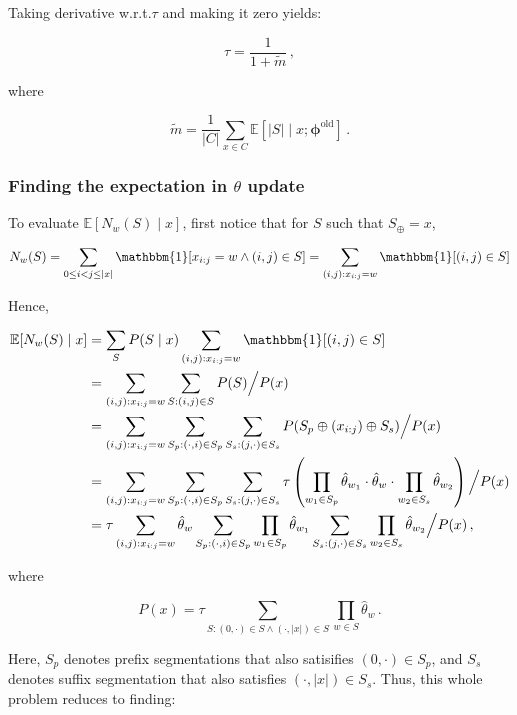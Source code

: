 \documentclass{article}
\begin{document}
\noindent
Taking derivative w.r.t.\@ $\tau$ and making it zero yields:

\[
    \tau = \frac{1}{1 + \tilde{m}}\,,
\]

\noindent
where

\[
    \tilde{m} = \frac{1}{|C|} \sum_{x \in C} \mathbb{E}[|S| \mid x; \boldsymbol\phi^\mathrm{old}]\,.
\]

\subsubsection{Finding the expectation in \texorpdfstring{$\theta$}{theta} update}
To evaluate $\mathbb{E}[N_w(S) \mid x]$, first notice that for $S$ such that $S_\oplus = x$,

\[
    N_w(S)
    = \sum_{0 \le i < j \le |x|} \mathbbm{1}[x_{i:j} = w \land (i,j) \in S]
    = \sum_{(i,j): x_{i:j} = w} \mathbbm{1}[(i,j) \in S]
\]

\noindent
Hence,

\[
    \begin{aligned}
        \mathbb{E}[N_w(S) \mid x]
        &= \sum_S P(S \mid x) \sum_{(i,j): x_{i:j} = w} \mathbbm{1}[(i,j) \in S]\\
        &= \sum_{(i,j): x_{i:j} = w} \sum_{S: (i,j) \in S} P(S) \Big/ P(x)\\
        &= \sum_{(i,j): x_{i:j} = w} \sum_{S_p: (\cdot, i) \in S_p} \sum_{S_s: (j, \cdot) \in S_s} P(S_p \oplus (x_{i:j}) \oplus S_s) \Big/ P(x)\\
        &= \sum_{(i,j): x_{i:j} = w} \sum_{S_p: (\cdot, i) \in S_p} \sum_{S_s: (j, \cdot) \in S_s} \tau \left(\prod_{w_1 \in S_p} \hat{\theta}_{w_1} \cdot \hat{\theta}_w \cdot \prod_{w_2 \in S_s} \hat{\theta}_{w_2}\right) \Big/ P(x)\\
        &= \tau \sum_{(i,j): x_{i:j} = w} \hat{\theta}_w \sum_{S_p: (\cdot, i) \in S_p} \prod_{w_1 \in S_p} \hat{\theta}_{w_1} \sum_{S_s: (j, \cdot) \in S_s} \prod_{w_2 \in S_s} \hat{\theta}_{w_2} \Big/ P(x)\,,
    \end{aligned}
\]

\noindent
where

\[
    P(x) = \tau \sum_{S: (0, \cdot) \in S \land (\cdot, |x|) \in S} \prod_{w \in S} \hat{\theta}_w\,.
\]

\noindent
Here, $S_p$ denotes prefix segmentations that also satisifies $(0, \cdot) \in S_p$, and $S_s$ denotes suffix segmentation that also satisfies $(\cdot, |x|) \in S_s$.
Thus, this whole problem reduces to finding:
\end{document}
